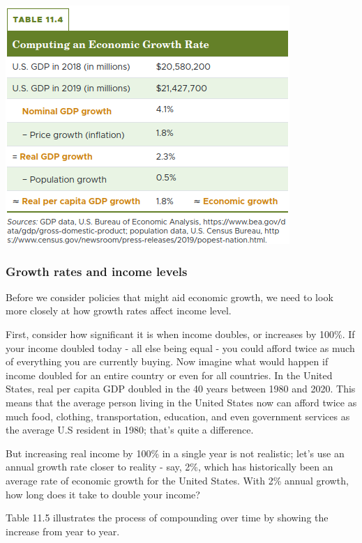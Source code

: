 \documentclass[11pt]{article} %
\begin{document}
\begin{center}
\includegraphics[scale=0.48]{../../images/Chapter 11/table 11.4 .png}
\end{center}

\subsubsection*{Growth rates and income levels}

Before we consider policies that might aid economic growth, we need to look more closely at how growth rates affect income level.

First, consider how significant it is when income doubles, or increases by 100\%. If your income doubled today - all else being equal - you could afford twice as much of everything you are currently buying. Now imagine what would happen if income doubled for an entire country or even for all countries. In the United States, real per capita GDP doubled in the 40 years between 1980 and 2020. This means that the average person living in the United States now can afford twice as much food, clothing, transportation, education, and even government services as the average U.S resident in 1980; that's quite a difference.

But increasing real income by 100\% in a single year is not realistic; let's use an annual growth rate closer to reality - say, 2\%, which has historically been an average rate of economic growth for the United States. With 2\% annual growth, how long does it take to double your income?

Table 11.5 illustrates the process of compounding over time by showing the increase from year to year.
\end{document}
